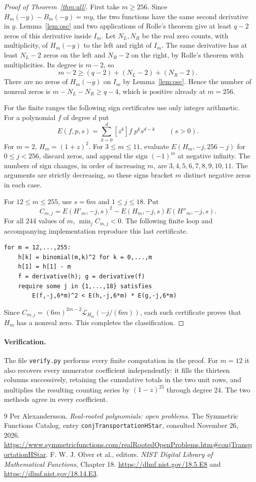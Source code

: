 \documentclass[11pt]{article}
\newcommand{\Lag}{\mathcal L}
\begin{document}
\begin{proof}[Proof of Theorem~\ref{thm:all}]
First take $m\ge256$. Since $H_m(-y)-B_m(-y)=my$, the two functions have the same second derivative in $y$. Lemma~\ref{lem:osc} and two applications of Rolle's theorem give at least $q-2$ zeros of this derivative inside $I_m$. Let $N_L,N_R$ be the real zero counts, with multiplicity, of $H_m(-y)$ to the left and right of $I_m$. The same derivative has at least $N_L-2$ zeros on the left and $N_R-2$ on the right, by Rolle's theorem with multiplicities. Its degree is $m-2$, so
\[
 m-2\ge(q-2)+(N_L-2)+(N_R-2).
\]
There are no zeros of $H_m(-y)$ on $I_m$ by Lemma~\ref{lem:osc}. Hence the number of nonreal zeros is $m-N_L-N_R\ge q-4$, which is positive already at $m=256$.

For the finite ranges the following sign certificates use only integer arithmetic. For a polynomial $f$ of degree $d$ put
\[
 E(f,p,s)=\sum_{k=0}^d [z^k]f\;p^k s^{d-k}\qquad(s>0).
\]
For $m=2$, $H_m=(1+z)^2$. For $3\le m\le11$, evaluate $E(H_m,-j,256-j)$ for $0\le j<256$, discard zeros, and append the sign $(-1)^m$ at negative infinity. The numbers of sign changes, in order of increasing $m$, are $3,4,5,6,7,8,9,10,11$. The arguments are strictly decreasing, so these signs bracket $m$ distinct negative zeros in each case.

For $12\le m\le255$, use $s=6m$ and $1\le j\le18$. Put
\[
 C_{m,j}=E(H'_m,-j,s)^2-E(H_m,-j,s)E(H''_m,-j,s).
\]
For all 244 values of $m$, $\min_j C_{m,j}<0$. The following finite loop and accompanying implementation reproduce this last certificate.
\begin{verbatim}
for m = 12,...,255:
    h[k] = binomial(m,k)^2 for k = 0,...,m
    h[1] = h[1] - m
    f = derivative(h); g = derivative(f)
    require some j in {1,...,18} satisfies
        E(f,-j,6*m)^2 < E(h,-j,6*m) * E(g,-j,6*m)
\end{verbatim}
Since $C_{m,j}=(6m)^{2m-2}\Lag_{H_m}(-j/(6m))$, each such certificate proves that $H_m$ has a nonreal zero. This completes the classification.
\end{proof}

\paragraph{Verification.} The file \texttt{verify.py} performs every finite computation in the proof. For $m=12$ it also recovers every numerator coefficient independently: it fills the thirteen columns successively, retaining the cumulative totals in the two unit rows, and multiplies the resulting counting series by $(1-z)^{25}$ through degree 24. The two methods agree in every coefficient.

\begin{thebibliography}{9}
 Per Alexandersson. \emph{Real-rooted polynomials: open problems}. The Symmetric Functions Catalog, entry \texttt{conjTransportationHStar}, consulted November 26, 2026. \url{https://www.symmetricfunctions.com/realRootedOpenProblems.htm#conjTransportationHStar}.
 F. W. J. Olver et al., editors. \emph{NIST Digital Library of Mathematical Functions}, Chapter 18. \url{https://dlmf.nist.gov/18.5.E8} and \url{https://dlmf.nist.gov/18.14.E3}.
\end{thebibliography}
\end{document}
